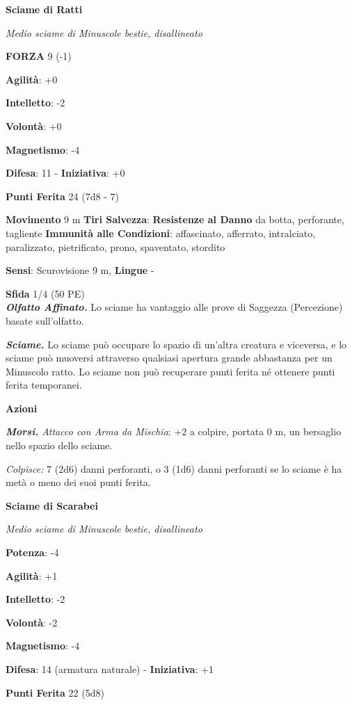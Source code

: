 \begin{multicols}{2}
\textbf{Sciame di Ratti}

\emph{Medio sciame di Minuscole bestie, disallineato}

\textbf{FORZA} 9 (-1)

\textbf{Agilità}: +0

\textbf{Intelletto}: -2

\textbf{Volontà}: +0

\textbf{Magnetismo}: -4

\textbf{Difesa}: 11 - \textbf{Iniziativa}: +0

\textbf{Punti Ferita} 24 (7d8 - 7)

\textbf{Movimento} 9 m
\textbf{Tiri Salvezza}:
\textbf{Resistenze al Danno} da botta, perforante, tagliente
\textbf{Immunità alle Condizioni}: affascinato, afferrato, intralciato,
paralizzato, pietrificato, prono, spaventato, stordito

\textbf{Sensi}: Scurovisione 9 m, 
\textbf{Lingue} -

\textbf{Sfida} 1/4 (50 PE)\smallskip\\

\emph{\textbf{Olfatto Affinato.}} Lo sciame ha vantaggio alle prove di
Saggezza (Percezione) basate sull'olfatto.

\emph{\textbf{Sciame.}} Lo sciame può occupare lo spazio di un'altra
creatura e viceversa, e lo sciame può muoversi attraverso qualsiasi
apertura grande abbastanza per un Minuscolo ratto. Lo sciame non può
recuperare punti ferita né ottenere punti ferita temporanei.

\smallskip\textbf{Azioni}

\emph{\textbf{Morsi.} Attacco con Arma da Mischia}: +2 a colpire,
portata 0 m, un bersaglio nello spazio dello sciame.

\emph{Colpisce:} 7 (2d6) danni perforanti, o 3 (1d6) danni perforanti se
lo sciame è ha metà o meno dei suoi punti ferita.

\textbf{Sciame di Scarabei}

\emph{Medio sciame di Minuscole bestie, disallineato}

\textbf{Potenza}: -4

\textbf{Agilità}: +1

\textbf{Intelletto}: -2

\textbf{Volontà}: -2

\textbf{Magnetismo}: -4

\textbf{Difesa}: 14 (armatura naturale) - \textbf{Iniziativa}: +1

\textbf{Punti Ferita} 22 (5d8)


\end{multicols}

